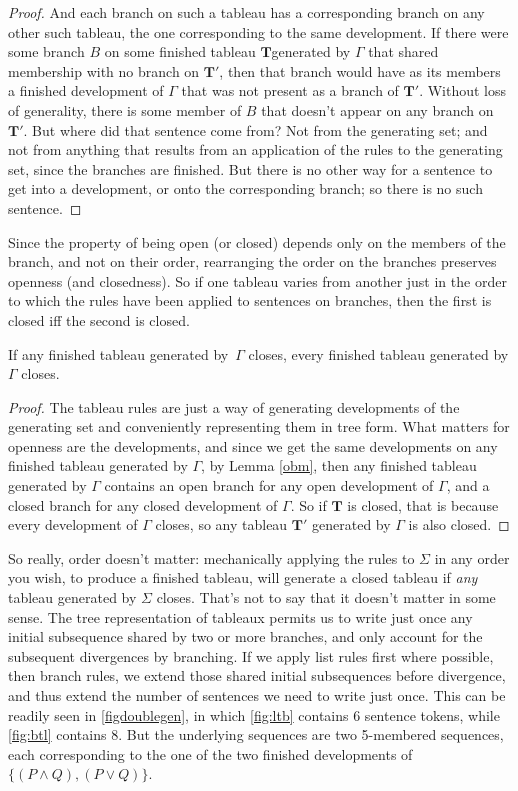 \begin{lemma}
\begin{proof}
And each branch on such a tableau has a corresponding branch on any other such tableau, the one corresponding to the same development. If there were some branch $B$ on some finished tableau $\mathbf{T}$generated by $\Gamma$ that shared membership with no branch on $\mathbf{T}'$, then that branch would have as its members a finished development of $\Gamma$ that was not present as a branch of $\mathbf{T}'$. Without loss of generality, there is some member of $B$ that doesn't appear on any branch on $\mathbf{T}'$. But where did that sentence come from? Not from the generating set; and not from anything that results from an application of the rules to the generating set, since the branches are finished. But there is no other way for a sentence to get into a development, or onto the corresponding branch; so there is no such sentence. 
	 \end{proof} 
\end{lemma}

Since the property of being open (or closed) depends only on the members of the branch, and not on their order, rearranging the order on the branches preserves openness (and closedness). So if one tableau varies from another just in the order to which the rules have been applied to sentences on branches, then the first is closed iff the second is closed. \begin{theorem}\label{thmorder}
	If any finished tableau generated by\, $\Gamma$ closes, every finished tableau generated by\, $\Gamma$ closes.
\begin{proof}
	The tableau rules are just a way of generating developments of the generating set and conveniently representing them in tree form. What matters for openness are the developments, and since we get the same developments on any finished tableau generated by $\Gamma$, by Lemma \ref{obm}, then any finished tableau generated by $\Gamma$ contains an open branch for any open development of $\Gamma$, and a closed branch for any closed development of $\Gamma$. So if $\mathbf{T}$ is closed, that is because every development of $\Gamma$ closes, so any tableau $\mathbf{T}'$ generated by $\Gamma$ is also closed.
\end{proof}\end{theorem} 
 So really, order doesn't matter: mechanically applying the rules to $\Sigma$ in any order you wish, to produce a finished tableau, will generate a closed tableau if \emph{any} tableau generated by $\Sigma$ closes. That's not to say that it doesn't matter in some sense. The tree representation of tableaux permits us to write just once any initial subsequence shared by two or more branches, and only account for the subsequent divergences by branching. If we apply list rules first where possible, then branch rules, we extend those shared initial subsequences before divergence, and thus extend the number of sentences we need to write just once. This can be readily seen in \autoref{figdoublegen}, in which \autoref{fig:ltb} contains 6 sentence tokens, while \autoref{fig:btl} contains 8. But the underlying sequences are two 5-membered sequences, each corresponding to the one of the two finished developments of $\{(P\wedge Q),(P \vee Q)\}$. 

